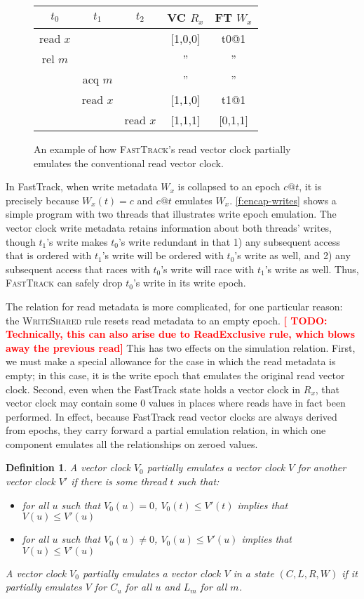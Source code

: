 \documentclass[preprint, 10pt]{sigplanconf}
\newcommand{\TODO}[1]{\textbf{\textcolor{red}{[ TODO: #1]}}}
\newcommand{\Tid}{t}
\newcommand{\Address}{x}
\newcommand{\Lock}{m}
\newcommand{\VCFont}{}
\newcommand{\ReadVC}[1]{\VCFont{R}_{#1}}
\newcommand{\WriteVC}[1]{\VCFont{W}_{#1}}
\newcommand{\FT}{\textsc{FastTrack}\xspace}
\newcommand{\Rule}[1]{\textsc{#1}}
\newtheorem{definition}{Definition}
\begin{document}
\begin{figure}[htb]
\centering
\begin{tabular}{ccc|c|c|}
$\Tid_0$ & $\Tid_1$ & $\Tid_2$ & VC $\ReadVC{\Address}$ & FT $\WriteVC{\Address}$ \\
\hline
read $\Address$ & &      & [1,0,0] & t0@1\\
rel $\Lock$ & &      &''&''\\
& acq $\Lock$ &      &''&''\\
& read $\Address$ &      &[1,1,0]&t1@1\\
& & read $\Address$      &[1,1,1]&[0,1,1]\\
\end{tabular}
\caption{An example of how \FT's read vector clock partially emulates the conventional read vector clock.}
\label{f:encap-readvc}
\end{figure}

In FastTrack, when write metadata $W_x$ is collapsed to an epoch $c@t$, it is precisely because $W_x(t) = c$ and $c@t$ emulates $W_x$. \autoref{f:encap-writes} shows a simple program with two threads that illustrates write epoch emulation. The vector clock write metadata retains information about both threads' writes, though $\Tid_1$'s write makes $\Tid_0$'s write redundant in that 1) any subsequent access that is ordered with $\Tid_1$'s write will be ordered with $\Tid_0$'s write as well, and 2) any subsequent access that races with $\Tid_0$'s write will race with $\Tid_1$'s write as well. Thus, \FT can safely drop $\Tid_0$'s write in its write epoch.

The relation for read metadata is more complicated, for one particular reason: the \Rule{WriteShared} rule resets read metadata to an empty epoch. \TODO{Technically, this can also arise due to ReadExclusive rule, which blows away the previous read} This has two effects on the simulation relation. First, we must make a special allowance for the case in which the read metadata is empty; in this case, it is the write epoch that emulates the original read vector clock. Second, even when the FastTrack state holds a vector clock in $R_x$, that vector clock may contain some 0 values in places where reads have in fact been performed. In effect, because FastTrack read vector clocks are always derived from epochs, they carry forward a partial emulation relation, in which one component emulates all the relationships on zeroed values.
\begin{definition}A vector clock $V_0$ \emph{partially emulates} a vector clock $V$ for another vector clock $V'$ if there is some thread $t$ such that:

\begin{itemize}
\item for all $u$ such that $V_0(u) = 0$, $V_0(t) \le V'(t)$ implies that $V(u) \le V'(u)$
\item for all $u$ such that $V_0(u) \neq 0$, $V_0(u) \le V'(u)$ implies that $V(u) \le V'(u)$
\end{itemize}
A vector clock $V_0$ partially emulates a vector clock $V$ in a state $(C, L, R, W)$ if it partially emulates $V$ for $C_u$ for all $u$ and $L_m$ for all $m$.\end{definition}
\end{document}
